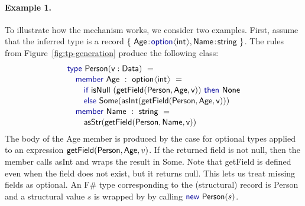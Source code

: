 \documentclass[10pt,preprint,blind,clearpagebib]{sigplanconf}
\newcommand{\langl}{\begin{picture}(4.5,7)
\put(1.1,2.5){\rotatebox{60}{\line(1,0){5.5}}}
\put(1.1,2.5){\rotatebox{300}{\line(1,0){5.5}}}
\end{picture}}
\newcommand{\rangl}{\begin{picture}(4.5,7)
\put(.9,2.5){\rotatebox{120}{\line(1,0){5.5}}}
\put(.9,2.5){\rotatebox{240}{\line(1,0){5.5}}}
\end{picture}}
\newcommand{\kvd}[1]{\textnormal{\textcolor{kvdclr}{\sffamily #1}}}
\newcommand{\ident}[1]{\textnormal{\sffamily #1}}
\begin{document}
\paragraph{Example 1.}
To illustrate how the mechanism works, we consider two examples. First, assume 
that the inferred type is a record  
$\{~\ident{Age}\!:\!\kvd{option}\langl\ident{int}\rangl, \ident{Name}\!:\!\ident{string}~ \}$. 
The rules from Figure~\ref{fig:tp-generation} produce the following class:
%
\begin{equation*}
\begin{array}{l}
 \kvd{type}~\ident{Person}(\ident{v}:\ident{Data})~= \\[0.1em]
 \quad \kvd{member}~\ident{Age}~:~\ident{option}\langl\ident{int}\rangl~= \\[0.1em]
 \qquad \kvd{if}~\ident{isNull}~(\ident{getField}(\ident{Person},\ident{Age}, \ident{v}))~\kvd{then}~\ident{None} \\[0.1em]
 \qquad \kvd{else}~\ident{Some}(\ident{asInt}(\ident{getField}(\ident{Person},\ident{Age}, \ident{v}))) \\[0.1em]
 \quad \kvd{member}~\ident{Name}~:~\ident{string}~= \\[0.1em]
 \qquad \ident{asStr}(\ident{getField}(\ident{Person},\ident{Name}, \ident{v}))
\end{array}
\end{equation*}
%
The body of the \ident{Age} member is produced by the case for optional types applied to an expression
$\ident{getField}(\ident{Person},\ident{Age},v)$. If the returned field is not \kvd{null}, then the member
calls \ident{asInt} and wraps the result in \ident{Some}. Note that \ident{getField} is defined even 
when the field does not exist, but it returns \kvd{null}. This lets us treat missing fields as 
optional. An F\# type corresponding to the (structural) record is \ident{Person} and a structural 
value $s$ is wrapped by by calling $\kvd{new}~\ident{Person}(s)$.
\end{document}
